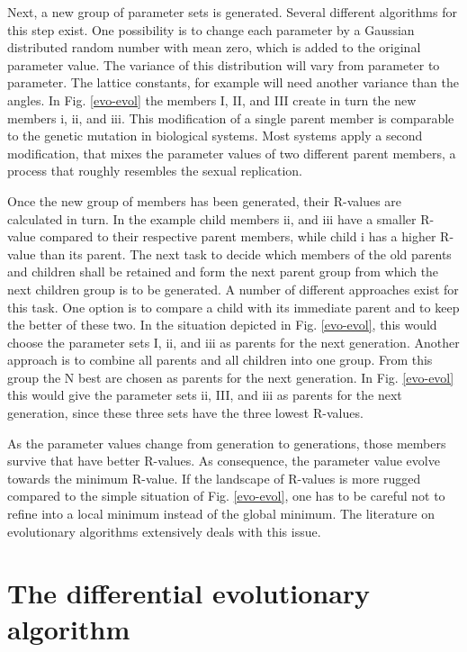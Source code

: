Next, a new group of
parameter sets is generated. Several different algorithms for this
step exist. One possibility is to change each parameter by a Gaussian
distributed random number with mean zero, which is added to the original
parameter value. The variance of this distribution will vary from
parameter to parameter. The lattice constants, for example will
need another variance than the angles. In Fig. \ref{evo-evol}
the members I, II, and III create in turn the new members i, ii, and iii.
This modification  of a single parent member is comparable to the 
genetic mutation in biological systems. Most systems apply a second
modification, that mixes the parameter values of two different parent
members, a process that roughly resembles the sexual replication.

Once the new group of members has been generated, their R-values are 
calculated in turn. In the example child members ii, and iii have a
smaller R-value compared to their respective parent members, while
child i has a higher R-value than its parent. The next task to decide 
which members of the old parents and children shall be retained and 
form the next parent group from which the next children group is to be
generated. A number of different approaches exist for this task. One
option is to compare a child with its immediate parent and to keep the 
better of these two. In the situation depicted in Fig. \ref{evo-evol},
this would choose the parameter sets I, ii, and iii as parents for the
next generation. Another approach is to combine all parents and all
children into one group. From this group the N best are chosen as 
parents for the next generation. In Fig. \ref{evo-evol} this would
give the parameter sets ii, III, and iii as parents for the next 
generation, since these three sets have the three lowest R-values.

As the parameter values change from generation to generations, those
members survive that have better R-values. As consequence, the parameter
value evolve towards the minimum R-value. If the landscape of R-values
is more rugged compared to the simple situation of 
Fig. \ref{evo-evol}, one has to be careful not to refine into a
local minimum instead of the global minimum. The literature on 
evolutionary algorithms extensively deals with this issue.

\section{The differential evolutionary algorithm \label{diff-price}}

